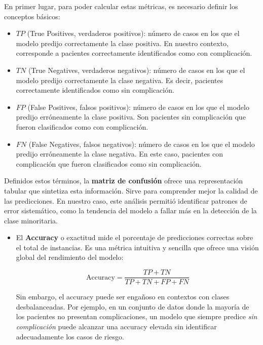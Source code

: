 En primer lugar, para poder calcular estas métricas, es necesario definir los conceptos básicos:

\begin{itemize}
    \item $TP$ (True Positives, verdaderos positivos): número de casos en los que el modelo predijo correctamente la clase positiva. En nuestro contexto, corresponde a pacientes correctamente identificados como con complicación.
    \item $TN$ (True Negatives, verdaderos negativos): número de casos en los que el modelo predijo correctamente la clase negativa. Es decir, pacientes correctamente identificados como sin complicación.
    \item $FP$ (False Positives, falsos positivos): número de casos en los que el modelo predijo erróneamente la clase positiva. Son pacientes sin complicación que fueron clasificados como con complicación.
    \item $FN$ (False Negatives, falsos negativos): número de casos en los que el modelo predijo erróneamente la clase negativa. En este caso, pacientes con complicación que fueron clasificados como sin complicación.
\end{itemize}

Definidos estos términos, la \textbf{matriz de confusión} ofrece una representación tabular que sintetiza esta información. Sirve para comprender mejor la calidad de las predicciones. En nuestro caso, este análisis permitió identificar patrones de error sistemático, como la tendencia del modelo a fallar más en la detección de la clase minoritaria.
   

\begin{itemize}
    \item El \textbf{Accuracy} o exactitud mide el porcentaje de predicciones correctas sobre el total de instancias. Es una métrica intuitiva y sencilla que ofrece una visión global del rendimiento del modelo:

    \[
    \text{Accuracy} = \frac{TP + TN}{TP + TN + FP + FN}
    \]

    Sin embargo, el accuracy puede ser engañoso en contextos con clases desbalanceadas. Por ejemplo, en un conjunto de datos donde la mayoría de los pacientes no presentan complicaciones, un modelo que siempre predice \textit{sin complicación} puede alcanzar una accuracy elevada sin identificar adecuadamente los casos de riesgo.

\end{itemize}

